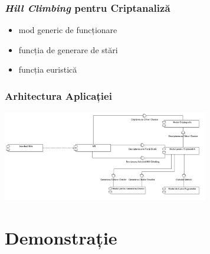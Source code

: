 \documentclass[xcolor={table}]{beamer}
\begin{document}
	\begin{frame}
		\frametitle{\textit{Hill Climbing} pentru Criptanaliză} \pause
		\begin{itemize}
			\item mod generic de funcționare \pause
			\item funcția de generare de stări \pause
			\item funcția euristică
		\end{itemize}
	\end{frame}
	
	\begin{frame}
		\frametitle{Arhitectura Aplicației} \pause
		\begin{center}
            \includegraphics[width=9cm]{images/components_diagram.png}
            \label{fig:infrastructure}
        \end{center}
	\end{frame}

	\section{Demonstrație}
\end{document}
